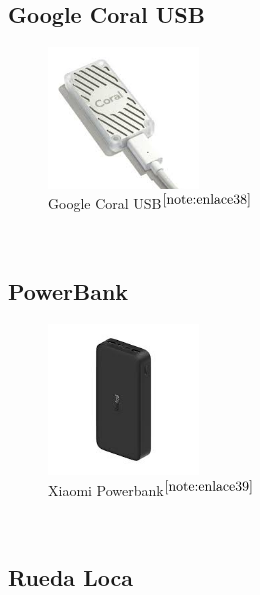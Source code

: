 \subsection{Google Coral USB}

\begin{figure} [h!]
	\begin{center}
		\includegraphics[width=4cm]{figs/googlecoral.png}
	\end{center}
	\caption{Google Coral USB$^{\ref{note:enlace38}}$} 
	\label{fig:googlecoral}
\end{figure}\

\setcounter{footnote}{38} %

\subsection{PowerBank}

\begin{figure} [h!]
	\begin{center}
		\includegraphics[width=4cm]{figs/powerbank.png}
	\end{center}
	\caption{Xiaomi Powerbank$^{\ref{note:enlace39}}$} 
	\label{fig:powerbank}
\end{figure}\

\setcounter{footnote}{39} %

\subsection{Rueda Loca}


